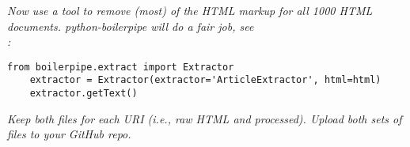\documentclass[12pt]{article}
\begin{document}
\emph{Now use a tool to remove (most) of the HTML markup for all 1000 HTML documents. python-boilerpipe will do a fair job, see \\}
\href{http://ws-dl.blogspot.com/2017/03/2017-03-20-survey-of-5-boilerplate.html}{\color{red}{http://ws-dl.blogspot.com/2017/03/2017-03-20-survey-of-5-boilerplate.html}} 
\emph{ :}
\begin{lstlisting}[numbers=none]
    from boilerpipe.extract import Extractor
    extractor = Extractor(extractor='ArticleExtractor', html=html)
    extractor.getText()
\end{lstlisting}
\emph{Keep both files for each URI (i.e., raw HTML and processed). Upload both sets of files to your GitHub repo.}
\subsection*{\color{blue}{Answer}}
 
  
\end{document}
